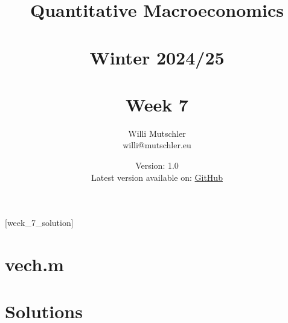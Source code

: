 
\newif\ifDisplaySolutions\DisplaySolutionstrue%


\title{Quantitative Macroeconomics\\~\\Winter 2024/25\\~\\Week 7}
\author{Willi Mutschler\\willi@mutschler.eu}
\date{Version: 1.0\\Latest version available on: \href{https://github.com/wmutschl/Quantitative-Macroeconomics/releases/latest/download/week_7.pdf}{GitHub}}
\maketitle\thispagestyle{empty}

\newpage
{}[week_7_solution]
\tableofcontents\thispagestyle{empty}\newpage

\setcounter{page}{1}
\newpage
\newpage
\newpage
\printbibliography%

\appendix
\section{vech.m}


\ifDisplaySolutions%
\newpage
\appendix
\section{Solutions}

\fi
